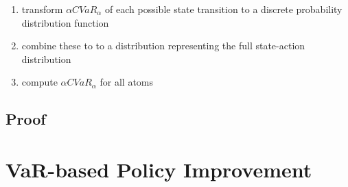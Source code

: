 \begin{enumerate}
\item transform $\alpha CVaR_\alpha$ of each possible state transition to a discrete probability distribution function
\item combine these to to a distribution representing the full state-action distribution
\item compute $\alpha CVaR_\alpha$ for all atoms
\end{enumerate}




%
%
%
%


\subsection{Proof}


\section{VaR-based Policy Improvement}
